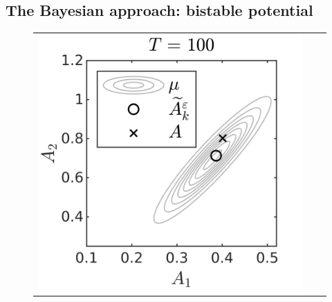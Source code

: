 \documentclass[10pt]{article}
\begin{document}
\subsection{The Bayesian approach: bistable potential}
\begin{figure}[t]
	\centering
	\begin{tabular}{ccc}
		ics[]{Figures/Bayes_T100} & \includegraph
\end{tabular}
\end{figure}
\end{document}
